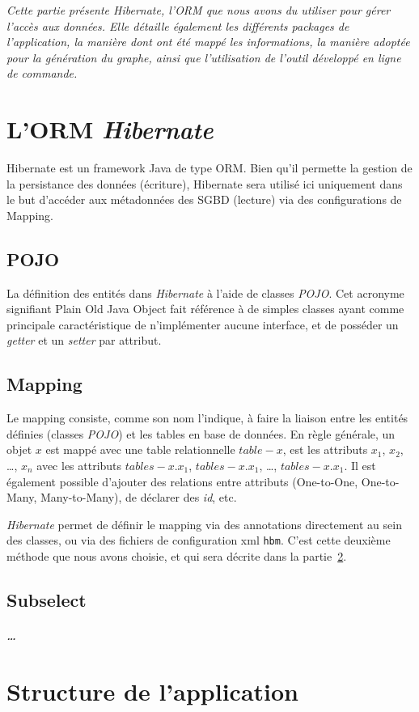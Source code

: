 \textit{Cette partie présente \emph{Hibernate}, l'ORM que nous avons du utiliser pour gérer l'accès aux données. Elle détaille également les différents packages de l'application, la manière dont ont été mappé les informations, la manière adoptée pour la génération du graphe, ainsi que l'utilisation de l'outil développé en ligne de commande.}

\section{L'ORM \emph{Hibernate}}
Hibernate est un framework Java de type ORM. Bien qu'il permette la gestion de la persistance des données (écriture), Hibernate sera utilisé ici uniquement dans le but d'accéder aux métadonnées des SGBD (lecture) via des configurations de Mapping.
\subsection{POJO}
La définition des entités dans \emph{Hibernate} à l'aide de classes \emph{POJO}. Cet acronyme signifiant \og Plain Old Java Object \fg{} fait référence à de simples classes ayant comme principale caractéristique de n'implémenter aucune interface, et de posséder un \emph{getter} et un \emph{setter} par attribut.
\subsection{Mapping}
Le mapping consiste, comme son nom l'indique, à faire la liaison entre les entités définies (classes \emph{POJO}) et les tables en base de données. En règle générale, un objet $x$ est mappé avec une table relationnelle $table-x$, est les attributs $x_1$, $x_2$, \ldots, $x_n$ avec les attributs $tables-x.x_1$, $tables-x.x_1$, \ldots, $tables-x.x_1$. Il est également possible d'ajouter des relations entre attributs (One-to-One, One-to-Many, Many-to-Many), de déclarer des \emph{id}, etc.

\emph{Hibernate} permet de définir le mapping via des annotations directement au sein des classes, ou via des fichiers de configuration xml \texttt{hbm}. C'est cette deuxième méthode que nous avons choisie, et qui sera décrite dans la partie~\ref{section:structure_de_lapplication}.
\subsection{Subselect}

\subparagraph{\ldots}

\section{Structure de l'application}
\label{section:structure_de_lapplication}

